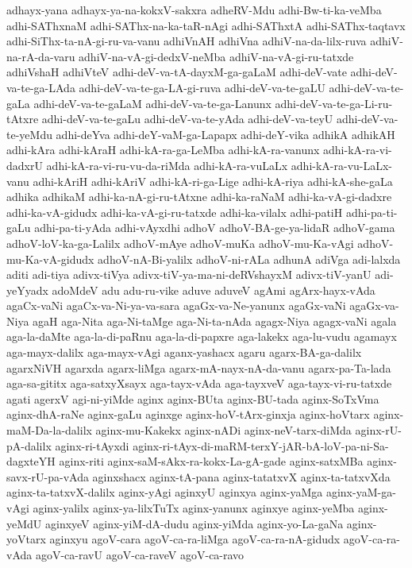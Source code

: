 {adhayx-yana
adhayx-ya-na-kokxV-sakxra
adheRV-Mdu
adhi-Bw-ti-ka-veMba
adhi-SAThxnaM
adhi-SAThx-na-ka-taR-nAgi
adhi-SAThxtA
adhi-SAThx-taqtavx
adhi-SiThx-ta-nA-gi-ru-va-vanu
adhiVnAH
adhiVna
adhiV-na-da-lilx-ruva
adhiV-na-rA-da-varu
adhiV-na-vA-gi-dedxV-neMba
adhiV-na-vA-gi-ru-tatxde
adhiVshaH
adhiVteV
adhi-deV-va-tA-dayxM-ga-gaLaM
adhi-deV-vate
adhi-deV-va-te-ga-LAda
adhi-deV-va-te-ga-LA-gi-ruva
adhi-deV-va-te-gaLU
adhi-deV-va-te-gaLa
adhi-deV-va-te-gaLaM
adhi-deV-va-te-ga-Lanunx
adhi-deV-va-te-ga-Li-ru-tAtxre
adhi-deV-va-te-gaLu
adhi-deV-va-te-yAda
adhi-deV-va-teyU
adhi-deV-va-te-yeMdu
adhi-deYva
adhi-deY-vaM-ga-Lapapx
adhi-deY-vika
adhikA
adhikAH
adhi-kAra
adhi-kAraH
adhi-kA-ra-ga-LeMba
adhi-kA-ra-vanunx
adhi-kA-ra-vi-dadxrU
adhi-kA-ra-vi-ru-vu-da-riMda
adhi-kA-ra-vuLaLx
adhi-kA-ra-vu-LaLx-vanu
adhi-kAriH
adhi-kAriV
adhi-kA-ri-ga-Lige
adhi-kA-riya
adhi-kA-she-gaLa
adhika
adhikaM
adhi-ka-nA-gi-ru-tAtxne
adhi-ka-raNaM
adhi-ka-vA-gi-dadxre
adhi-ka-vA-gidudx
adhi-ka-vA-gi-ru-tatxde
adhi-ka-vilalx
adhi-patiH
adhi-pa-ti-gaLu
adhi-pa-ti-yAda
adhi-vAyxdhi
adhoV
adhoV-BA-ge-ya-lidaR
adhoV-gama
adhoV-loV-ka-ga-Lalilx
adhoV-mAye
adhoV-muKa
adhoV-mu-Ka-vAgi
adhoV-mu-Ka-vA-gidudx
adhoV-nA-Bi-yalilx
adhoV-ni-rALa
adhunA
adiVga
adi-lalxda
aditi
adi-tiya
adivx-tiVya
adivx-tiV-ya-ma-ni-deRVshayxM
adivx-tiV-yanU
adi-yeYyadx
adoMdeV
adu
adu-ru-vike
aduve
aduveV
agAmi
agArx-hayx-vAda
agaCx-vaNi
agaCx-va-Ni-ya-va-sara
agaGx-va-Ne-yanunx
agaGx-vaNi
agaGx-va-Niya
agaH
aga-Nita
aga-Ni-taMge
aga-Ni-ta-nAda
agagx-Niya
agagx-vaNi
agala
aga-la-daMte
aga-la-di-paRnu
aga-la-di-papxre
aga-lakekx
aga-lu-vudu
agamayx
aga-mayx-dalilx
aga-mayx-vAgi
aganx-yashacx
agaru
agarx-BA-ga-dalilx
agarxNiVH
agarxda
agarx-liMga
agarx-mA-nayx-nA-da-vanu
agarx-pa-Ta-lada
aga-sa-gititx
aga-satxyXsayx
aga-tayx-vAda
aga-tayxveV
aga-tayx-vi-ru-tatxde
agati
agerxV
agi-ni-yiMde
aginx
aginx-BUta
aginx-BU-tada
aginx-SoTxVma
aginx-dhA-raNe
aginx-gaLu
aginxge
aginx-hoV-tArx-ginxja
aginx-hoVtarx
aginx-maM-Da-la-dalilx
aginx-mu-Kakekx
aginx-nADi
aginx-neV-tarx-diMda
aginx-rU-pA-dalilx
aginx-ri-tAyxdi
aginx-ri-tAyx-di-maRM-terxY-jAR-bA-loV-pa-ni-Sa-dagxteYH
aginx-riti
aginx-saM-sAkx-ra-kokx-La-gA-gade
aginx-satxMBa
aginx-savx-rU-pa-vAda
aginxshacx
aginx-tA-pana
aginx-tatatxvX
aginx-ta-tatxvXda
aginx-ta-tatxvX-dalilx
aginx-yAgi
aginxyU
aginxya
aginx-yaMga
aginx-yaM-ga-vAgi
aginx-yalilx
aginx-ya-lilxTuTx
aginx-yanunx
aginxye
aginx-yeMba
aginx-yeMdU
aginxyeV
aginx-yiM-dA-dudu
aginx-yiMda
aginx-yo-La-gaNa
aginx-yoVtarx
aginxyu
agoV-cara
agoV-ca-ra-liMga
agoV-ca-ra-nA-gidudx
agoV-ca-ra-vAda
agoV-ca-ravU
agoV-ca-raveV
agoV-ca-ravo
}
